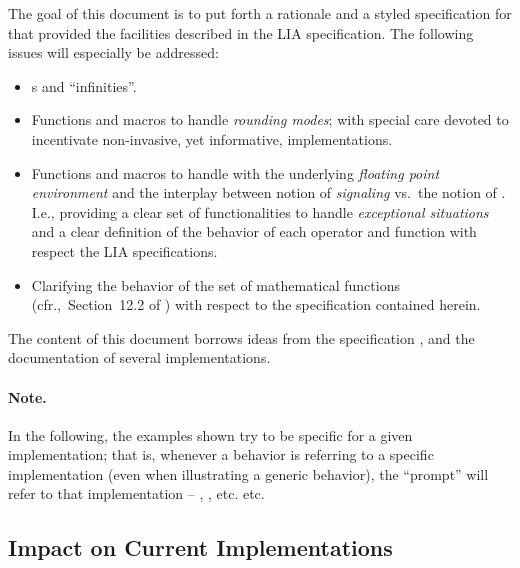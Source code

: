 \documentclass[../../CDR-IEEE-754-support.tex]{subfiles}
\begin{document}

The goal of this document is to put forth a rationale and a \ANSICL{}
styled specification for \CL{} that provided the facilities described
in the \IECLIA{} LIA specification.
%
The following issues will especially 
be addressed:
\begin{itemize}
\item {}s and ``infinities''.

\item Functions and macros to handle \emph{rounding modes}; with
  special care devoted to incentivate non-invasive, yet informative,
  implementations.

\item Functions and macros to handle with the underlying
  \emph{floating point environment} and the interplay between
  \IEEEFPStd{} notion of \emph{signaling} vs.~the \CL{} notion of
  .  I.e., providing a clear set of
  functionalities to handle \emph{exceptional situations} and a clear
  definition of the behavior of each operator and function with
  respect the LIA specifications.
  
\item Clarifying the behavior of the \CL{} set of mathematical
  functions (cfr.,~Section~12.2 of \cite{1996:ANSIHyperSpec}) with respect
  to the specification contained herein.
\end{itemize}

\vspace*{3mm}

The content of this document borrows ideas from the \CLang{}
specification \cite{2018:C18}, and the documentation of
several \CL{} implementations.

\paragraph{Note.} In the following, the examples shown try to be
specific for a given implementation; that is, whenever a behavior is
referring to a specific implementation (even when illustrating a
generic behavior), the ``prompt'' will refer to that implementation --
, , etc. etc.


\subsection{Impact on Current \CL{} Implementations}

\end{document}
